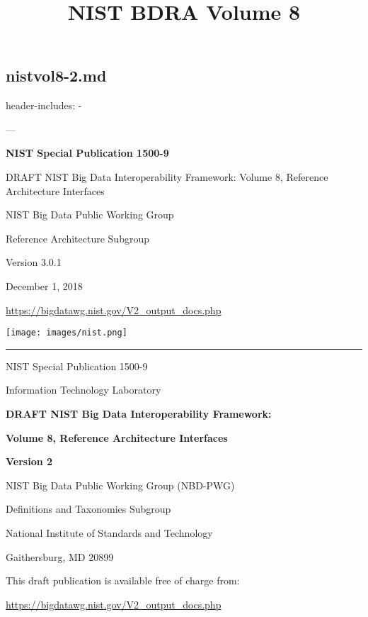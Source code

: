 \documentclass[9pt,]{article}
\title{NIST BDRA Volume 8}
\date{}
\newenvironment{Shaded}{}{}
\newcommand{\ExtensionTok}[1]{#1}
\newcommand{\NormalTok}[1]{#1}
\begin{document}
\maketitle

{
\setcounter{tocdepth}{3}
\tableofcontents
}
\hypertarget{nistvol8-2.md}{%
\subsection{nistvol8-2.md}\label{nistvol8-2.md}}

header-includes: - \usepackage[margins=raggedright]{floatrow} ---

\textbf{NIST Special Publication 1500-9}

\begin{Shaded}
\begin{Highlighting}[]
\ExtensionTok{DRAFT}\NormalTok{ NIST Big Data Interoperability Framework:}
\ExtensionTok{Volume}\NormalTok{ 8, Reference}
\ExtensionTok{Architecture}\NormalTok{ Interfaces}
\end{Highlighting}
\end{Shaded}

NIST Big Data Public Working Group

Reference Architecture Subgroup

Version 3.0.1

December 1, 2018

\url{https://bigdatawg.nist.gov/V2_output_docs.php}

\texttt{[image: images/nist.png]}

\begin{center}\rule{0.5\linewidth}{\linethickness}\end{center}

NIST Special Publication 1500-9

Information Technology Laboratory

\textbf{DRAFT NIST Big Data Interoperability Framework:}

\textbf{Volume 8, Reference Architecture Interfaces}

\textbf{Version 2}

NIST Big Data Public Working Group (NBD-PWG)

Definitions and Taxonomies Subgroup

National Institute of Standards and Technology

Gaithersburg, MD 20899

This draft publication is available free of charge from:

\url{https://bigdatawg.nist.gov/V2_output_docs.php}
\end{document}
